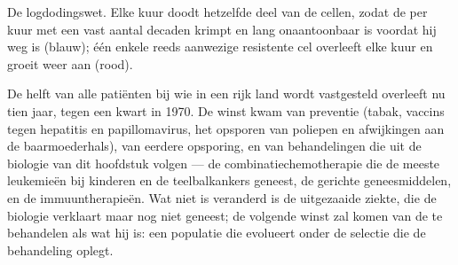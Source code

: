 \begin{omfigure}

{\small De logdodingswet. Elke kuur doodt hetzelfde deel van de cellen,
zodat de  per kuur met een vast aantal decaden krimpt en lang
onaantoonbaar is voordat hij weg is (blauw); één enkele reeds
aanwezige resistente cel overleeft elke kuur en groeit weer aan (rood).}
\end{omfigure}

\begin{remark}\label{rem:b3:cancer-biology:changed}
De helft van alle patiënten bij wie in een rijk land  wordt
vastgesteld overleeft nu tien jaar, tegen een kwart in 1970. De winst
kwam van preventie (tabak, vaccins tegen hepatitis en
papillomavirus, het opsporen van poliepen en afwijkingen aan de
baarmoederhals), van eerdere opsporing, en van behandelingen die uit de
biologie van dit hoofdstuk volgen --- de combinatiechemotherapie die de
meeste leukemieën bij kinderen en de teelbalkankers geneest, de
gerichte geneesmiddelen, en de immuuntherapieën. Wat niet is veranderd
is de uitgezaaide ziekte, die de biologie verklaart maar nog niet
geneest; de volgende winst zal komen van de  te behandelen als wat
hij is: een populatie die evolueert onder de selectie die de
behandeling oplegt.
\end{remark}

